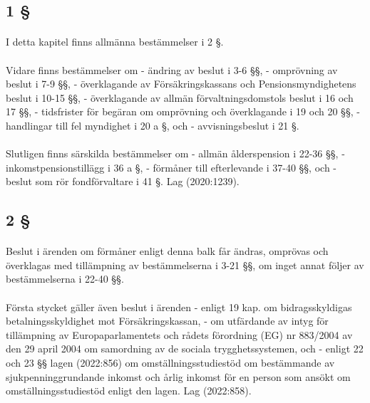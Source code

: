 \documentclass[a4paper,notitlepage,openany,10pt]{book}
\begin{document}
\subsection*{1 §}
\paragraph*{}
I detta kapitel finns allmänna bestämmelser i 2 §.
\paragraph*{}
Vidare finns bestämmelser om
\newline - ändring av beslut i 3-6 §§,
\newline - omprövning av beslut i 7-9 §§,
\newline - överklagande av Försäkringskassans och Pensionsmyndighetens beslut i 10-15 §§,
\newline - överklagande av allmän förvaltningsdomstols beslut i 16 och 17 §§,
\newline - tidsfrister för begäran om omprövning och överklagande i 19 och 20 §§,
\newline - handlingar till fel myndighet i 20 a §, och
\newline - avvisningsbeslut i 21 §.
\paragraph*{}
Slutligen finns särskilda bestämmelser om
\newline - allmän ålderspension i 22-36 §§,
\newline - inkomstpensionstillägg i 36 a §,
\newline - förmåner till efterlevande i 37-40 §§, och
\newline - beslut som rör fondförvaltare i 41 §.
Lag (2020:1239).
\subsection*{2 §}
\paragraph*{}
Beslut i ärenden om förmåner enligt denna balk får ändras, omprövas och överklagas med tillämpning av bestämmelserna i 3-21 §§, om inget annat följer av bestämmelserna i 22-40 §§.
\paragraph*{}
Första stycket gäller även beslut i ärenden
\newline - enligt 19 kap. om bidragsskyldigas betalningsskyldighet mot Försäkringskassan,
\newline - om utfärdande av intyg för tillämpning av Europaparlamentets och rådets förordning (EG) nr 883/2004 av den 29 april 2004 om samordning av de sociala trygghetssystemen, och
\newline - enligt 22 och 23 §§ lagen (2022:856) om omställningsstudiestöd om bestämmande av sjukpenninggrundande inkomst och årlig inkomst för en person som ansökt om omställningsstudiestöd enligt den lagen.
Lag (2022:858).
\end{document}
